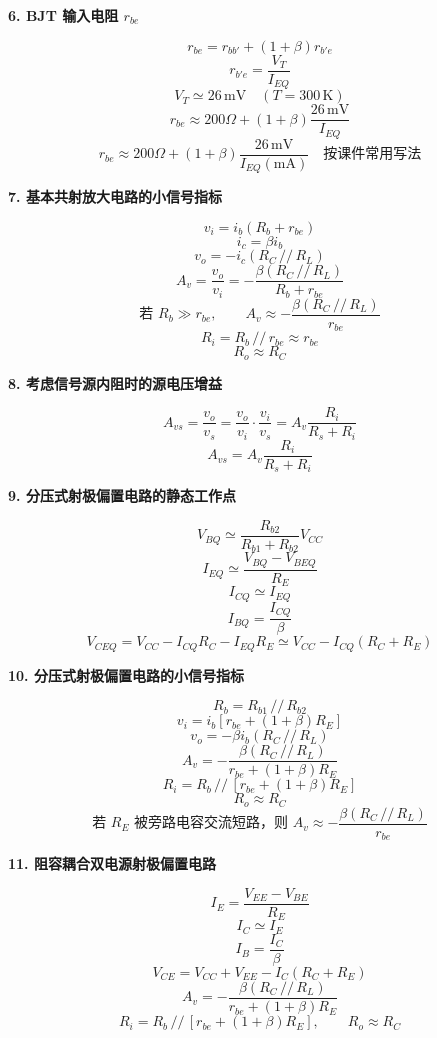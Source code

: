 \documentclass[12pt]{article}
\newcommand{\sectionbox}[1]{%
  \vspace{4pt}
  {\Large\bfseries\color{accent}#1}\par
  \vspace{2pt}
}
\newcommand{\pp}{\,/ /\,}
\begin{document}
\sectionbox{6. BJT 输入电阻 $r_{be}$}

\begin{tcolorbox}
\[
r_{be}=r_{bb'}+(1+\beta)r_{b'e}
\]
\[
r_{b'e}=\frac{V_T}{I_{EQ}}
\]
\[
V_T\simeq 26\,\mathrm{mV}\quad (T=300\,\mathrm{K})
\]
\[
r_{be}\approx 200\Omega +(1+\beta)\frac{26\,\mathrm{mV}}{I_{EQ}}
\]
\[
r_{be}\approx 200\Omega +(1+\beta)\frac{26\,\mathrm{mV}}{I_{EQ}(\mathrm{mA})}
\quad\text{按课件常用写法}
\]
\end{tcolorbox}

\sectionbox{7. 基本共射放大电路的小信号指标}

\begin{tcolorbox}
\[
v_i=i_b(R_b+r_{be})
\]
\[
i_c=\beta i_b
\]
\[
v_o=-i_c(R_C\pp R_L)
\]
\[
A_v=\frac{v_o}{v_i}
=-\frac{\beta(R_C\pp R_L)}{R_b+r_{be}}
\]
\[
\text{若 } R_b\gg r_{be},\qquad
A_v\approx -\frac{\beta(R_C\pp R_L)}{r_{be}}
\]
\[
R_i=R_b\pp r_{be}\approx r_{be}
\]
\[
R_o\approx R_C
\]
\end{tcolorbox}

\sectionbox{8. 考虑信号源内阻时的源电压增益}

\begin{tcolorbox}
\[
A_{vs}=\frac{v_o}{v_s}
=\frac{v_o}{v_i}\cdot\frac{v_i}{v_s}
=A_v\frac{R_i}{R_s+R_i}
\]
\[
A_{vs}=A_v\frac{R_i}{R_s+R_i}
\]
\end{tcolorbox}

\sectionbox{9. 分压式射极偏置电路的静态工作点}

\begin{tcolorbox}
\[
V_{BQ}\simeq \frac{R_{b2}}{R_{b1}+R_{b2}}V_{CC}
\]
\[
I_{EQ}\simeq \frac{V_{BQ}-V_{BEQ}}{R_E}
\]
\[
I_{CQ}\simeq I_{EQ}
\]
\[
I_{BQ}=\frac{I_{CQ}}{\beta}
\]
\[
V_{CEQ}=V_{CC}-I_{CQ}R_C-I_{EQ}R_E
\simeq V_{CC}-I_{CQ}(R_C+R_E)
\]
\end{tcolorbox}

\sectionbox{10. 分压式射极偏置电路的小信号指标}

\begin{tcolorbox}
\[
R_b=R_{b1}\pp R_{b2}
\]
\[
v_i=i_b\left[r_{be}+(1+\beta)R_E\right]
\]
\[
v_o=-\beta i_b(R_C\pp R_L)
\]
\[
A_v=-\frac{\beta(R_C\pp R_L)}
{r_{be}+(1+\beta)R_E}
\]
\[
R_i=R_b\pp\left[r_{be}+(1+\beta)R_E\right]
\]
\[
R_o\approx R_C
\]
\[
\text{若 } R_E \text{ 被旁路电容交流短路，则 }
A_v\approx-\frac{\beta(R_C\pp R_L)}{r_{be}}
\]
\end{tcolorbox}

\sectionbox{11. 阻容耦合双电源射极偏置电路}

\begin{tcolorbox}
\[
I_E=\frac{V_{EE}-V_{BE}}{R_E}
\]
\[
I_C\simeq I_E
\]
\[
I_B=\frac{I_C}{\beta}
\]
\[
V_{CE}=V_{CC}+V_{EE}-I_C(R_C+R_E)
\]
\[
A_v=-\frac{\beta(R_C\pp R_L)}
{r_{be}+(1+\beta)R_E}
\]
\[
R_i=R_b\pp\left[r_{be}+(1+\beta)R_E\right],
\qquad
R_o\approx R_C
\]
\end{tcolorbox}
\end{document}
